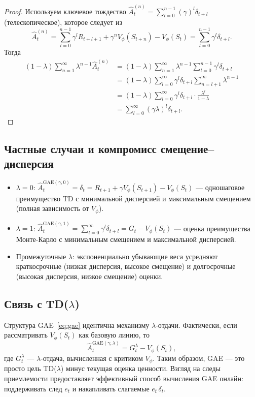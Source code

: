 \begin{proof}
Используем ключевое тождество $\hat A_t^{(n)} = \sum_{l=0}^{n-1}(\gamma)^l\delta_{t+l}$ (телескопическое), которое следует из
\[
\hat A_t^{(n)} = \sum_{l=0}^{n-1}\gamma^l R_{t+l+1} + \gamma^n V_\phi(S_{t+n}) - V_\phi(S_t)
= \sum_{l=0}^{n-1}\gamma^l\delta_{t+l}.
\]
Тогда
\begin{align*}
(1-\lambda)\sum_{n=1}^{\infty}\lambda^{n-1}\hat A_t^{(n)}
&= (1-\lambda)\sum_{n=1}^{\infty}\lambda^{n-1}\sum_{l=0}^{n-1}\gamma^l\delta_{t+l}\\
&= (1-\lambda)\sum_{l=0}^{\infty}\gamma^l\delta_{t+l}\sum_{n=l+1}^{\infty}\lambda^{n-1}\\
&= (1-\lambda)\sum_{l=0}^{\infty}\gamma^l\delta_{t+l}\cdot\frac{\lambda^l}{1-\lambda}\\
&= \sum_{l=0}^{\infty}(\gamma\lambda)^l\delta_{t+l}.
\end{align*}
\end{proof}

\subsection{Частные случаи и компромисс смещение--дисперсия}

\begin{itemize}[leftmargin=*]
  \item $\lambda = 0$: $\hat A_t^{\mathrm{GAE}(\gamma,0)} = \delta_t = R_{t+1}+\gamma V_\phi(S_{t+1})-V_\phi(S_t)$ --- одношаговое преимущество TD с минимальной дисперсией и максимальным смещением (полная зависимость от $V_\phi$).
  \item $\lambda = 1$: $\hat A_t^{\mathrm{GAE}(\gamma,1)} = \sum_{l=0}^{\infty}\gamma^l\delta_{t+l} = G_t - V_\phi(S_t)$ --- оценка преимущества Монте-Карло с минимальным смещением и максимальной дисперсией.
  \item Промежуточные $\lambda$: экспоненциально убывающие веса усредняют краткосрочные (низкая дисперсия, высокое смещение) и долгосрочные (высокая дисперсия, низкое смещение) оценки.
\end{itemize}

\subsection{Связь с TD($\lambda$)}

Структура GAE~\eqref{eq:gae} идентична механизму $\lambda$-отдачи.  Фактически, если рассматривать $V_\phi(S_t)$ как базовую линию, то
\[
\hat A_t^{\mathrm{GAE}(\gamma,\lambda)} = G_t^\lambda - V_\phi(S_t),
\]
где $G_t^\lambda$ --- $\lambda$-отдача, вычисленная с критиком $V_\phi$.  Таким образом, GAE --- это просто цель TD($\lambda$) минус текущая оценка ценности.  Взгляд на следы приемлемости предоставляет эффективный способ вычисления GAE онлайн: поддерживать след $e_t$ и накапливать слагаемые $e_t\,\delta_t$.

